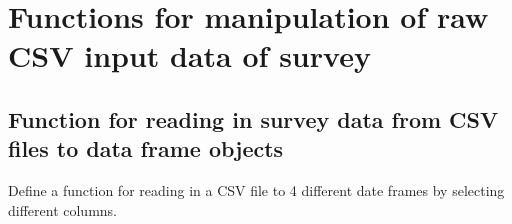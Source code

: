 \documentclass [oneside,10pt,a4paper,ngerman,BCOR10mm,headsepline,parindent,final]{scrartcl}
\begin{document}
    \hypertarget{functions-for-manipulation-of-raw-csv-input-data-of-survey}{%
\section{Functions for manipulation of raw CSV input data of
survey}\label{functions-for-manipulation-of-raw-csv-input-data-of-survey}}

\hypertarget{function-for-reading-in-survey-data-from-csv-files-to-data-frame-objects}{%
\subsection{Function for reading in survey data from CSV files to data
frame
objects}\label{function-for-reading-in-survey-data-from-csv-files-to-data-frame-objects}}

Define a function for reading in a CSV file to 4 different date frames
by selecting different columns.
\end{document}
